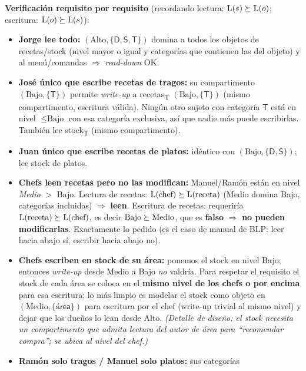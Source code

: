 \textbf{Verificación requisito por requisito} (recordando lectura: $\mathrm{L}(s)\succeq\mathrm{L}(o)$;
escritura: $\mathrm{L}(o)\succeq\mathrm{L}(s)$):
\begin{itemize}
  \item \textbf{Jorge lee todo:} $(\text{Alto},\{\textsf{D},\textsf{S},\textsf{T}\})$ domina a
        todos los objetos de recetas/stock (nivel mayor o igual y categorías que contienen las
        del objeto) y al menú/comandas $\Rightarrow$ \emph{read-down} OK.
  \item \textbf{José único que escribe recetas de tragos:} su compartimento
        $(\text{Bajo},\{\textsf{T}\})$ permite \emph{write-up} a recetas\textsubscript{T}
        $(\text{Bajo},\{\textsf{T}\})$ (mismo compartimento, escritura válida). Ningún otro
        sujeto con categoría $\textsf{T}$ está en nivel $\le \text{Bajo}$ con esa categoría
        exclusiva, así que nadie más puede escribirlas. También lee stock\textsubscript{T}
        (mismo compartimento).
  \item \textbf{Juan único que escribe recetas de platos:} idéntico con
        $(\text{Bajo},\{\textsf{D},\textsf{S}\})$; lee stock de platos.
  \item \textbf{Chefs leen recetas pero no las modifican:} Manuel/Ramón están en nivel
        \emph{Medio} $>$ Bajo. Lectura de recetas: $\mathrm{L}(\text{chef})\succeq\mathrm{L}(\text{receta})$
        (Medio domina Bajo, categorías incluidas) $\Rightarrow$ \textbf{leen}. Escritura de
        recetas: requeriría $\mathrm{L}(\text{receta})\succeq\mathrm{L}(\text{chef})$, es decir
        $\text{Bajo}\succeq\text{Medio}$, que es \textbf{falso} $\Rightarrow$ \textbf{no pueden
        modificarlas}. Exactamente lo pedido (es el caso de manual de BLP: leer hacia abajo
        sí, escribir hacia abajo no).
  \item \textbf{Chefs escriben en stock de su área:} ponemos el stock en nivel Bajo; entonces
        \emph{write-up} desde Medio a Bajo \emph{no} valdría. Para respetar el requisito el
        stock de cada área se coloca en el \textbf{mismo nivel de los chefs o por encima} para
        esa escritura; lo más limpio es modelar el stock como objeto en
        $(\text{Medio},\{\textsf{área}\})$ para escritura por el chef (write-up trivial al
        mismo nivel) y dejar que los dueños lo lean desde Alto. \emph{(Detalle de diseño: el
        stock necesita un compartimento que admita lectura del autor de área para
        ``recomendar compra''; se ubica al nivel del chef.)}
  \item \textbf{Ramón solo tragos / Manuel solo platos:} sus categorías

\end{itemize}
